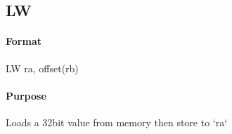 \subsection{LW}


\paragraph{Format} LW ra, offset(rb)

\paragraph{Purpose} Loads a 32bit value from memory then store to `ra`